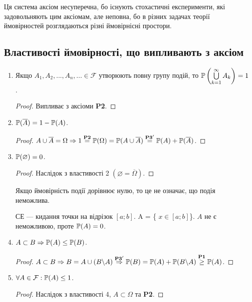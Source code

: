 Ця система аксіом несуперечна, бо існують стохастичні експерименти,
які задовольняють цим аксіомам, але неповна, бо в різних задачах
теорії ймовірностей розглядаються різні ймовірнісні простори.

\subsection{Властивості ймовірності, що випливають з аксіом}
\begin{enumerate}
    \item Якщо $A_1, A_2, ..., A_n, ... \in \mathcal{F}$ утворюють повну групу 
    подій, то $\P\left(\bigcup\limits_{k=1}^\infty A_k\right) = 1$.
    \begin{proof}
        Випливає з аксіоми \textbf{P2}.
    \end{proof}
    \item $\P(\overline{A}) = 1 - \P(A)$.
    \begin{proof}
        $A \cup \overline{A} = \Omega \Rightarrow 1 \overset{\text{\textbf{P2}}}{=} \P(\Omega) 
        = \P(A \cup \overline{A}) \overset{\text{\textbf{P3}}'}{=} \P(A) + \P(\overline{A})$.
    \end{proof}
    \item $\P(\varnothing) = 0$.
    \begin{proof}
        Наслідок з властивості 2 $(\varnothing = \overline{\Omega})$.
    \end{proof}
    \begin{remark}
        Якщо ймовірність події дорівнює нулю, то це не означає, що подія неможлива.
    \end{remark}
    \begin{example}
        СЕ --- кидання точки на відрізок $[a; b]$. A = \{ $x \in [a; b]$\}. $A$ не є неможливою, проте $\P(A) = 0$.
    \end{example}
    \item $A \subset B \Rightarrow \P(A) \leq \P(B)$.
    \begin{proof}
        $A \subset B \Rightarrow B = A \cup (B \backslash A) 
        \overset{\text{\textbf{P3}}'}{\Rightarrow} \P(B) = \P(A) + \P(B \backslash A) 
        \overset{\text{\textbf{P1}}}{\geq} \P(A)$.
    \end{proof}
    \item $\forall A \in \mathcal{F}: \P(A) \leq 1$.
    \begin{proof}
        Наслідок з властивості 4, $A \subset \Omega$ та \textbf{P2}.

\end{proof}
\end{enumerate}
